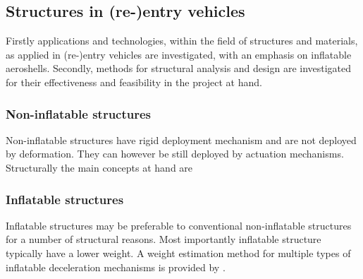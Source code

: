 \subsection{Structures in (re-)entry vehicles}\label{sec:struc}
Firstly applications and technologies, within the field of structures and materials, as applied in (re-)entry vehicles are investigated, with an emphasis on inflatable aeroshells. Secondly, methods for structural analysis and design are investigated for their effectiveness and feasibility in the project at hand.

\subsubsection{Non-inflatable structures}
Non-inflatable structures have rigid deployment mechanism and are not deployed by deformation. They can however be still deployed by actuation mechanisms. Structurally the main concepts at hand are



\subsubsection{Inflatable structures}




Inflatable structures may be preferable to conventional non-inflatable structures for a number of structural reasons. Most importantly inflatable structure typically have a lower weight. A weight estimation method for multiple types of inflatable deceleration mechanisms is provided by \cite{Samareh2011}.






